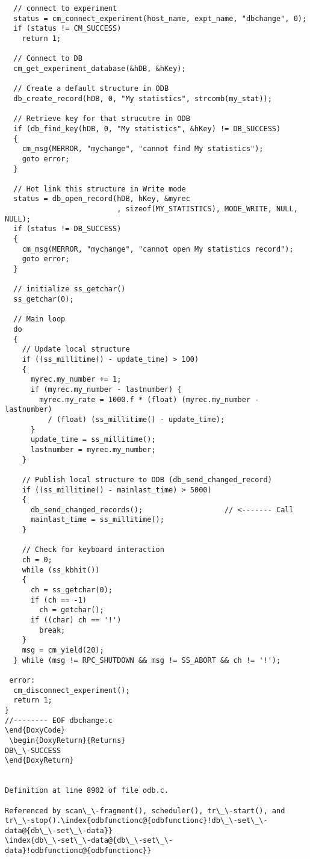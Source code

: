 \begin{DoxyItemize}
\begin{DoxyCode}
\begin{verbatim}
  // connect to experiment
  status = cm_connect_experiment(host_name, expt_name, "dbchange", 0);
  if (status != CM_SUCCESS)
    return 1;

  // Connect to DB
  cm_get_experiment_database(&hDB, &hKey);

  // Create a default structure in ODB
  db_create_record(hDB, 0, "My statistics", strcomb(my_stat));

  // Retrieve key for that strucutre in ODB
  if (db_find_key(hDB, 0, "My statistics", &hKey) != DB_SUCCESS)
  {
    cm_msg(MERROR, "mychange", "cannot find My statistics");
    goto error;
  }

  // Hot link this structure in Write mode
  status = db_open_record(hDB, hKey, &myrec
                          , sizeof(MY_STATISTICS), MODE_WRITE, NULL, NULL);
  if (status != DB_SUCCESS)
  {
    cm_msg(MERROR, "mychange", "cannot open My statistics record");
    goto error;
  }

  // initialize ss_getchar()
  ss_getchar(0);

  // Main loop
  do
  {
    // Update local structure
    if ((ss_millitime() - update_time) > 100)
    {
      myrec.my_number += 1;
      if (myrec.my_number - lastnumber) {
        myrec.my_rate = 1000.f * (float) (myrec.my_number - lastnumber)
          / (float) (ss_millitime() - update_time);
      }
      update_time = ss_millitime();
      lastnumber = myrec.my_number;
    }

    // Publish local structure to ODB (db_send_changed_record)
    if ((ss_millitime() - mainlast_time) > 5000)
    {
      db_send_changed_records();                   // <------- Call
      mainlast_time = ss_millitime();
    }

    // Check for keyboard interaction
    ch = 0;
    while (ss_kbhit())
    {
      ch = ss_getchar(0);
      if (ch == -1)
        ch = getchar();
      if ((char) ch == '!')
        break;
    }
    msg = cm_yield(20);
  } while (msg != RPC_SHUTDOWN && msg != SS_ABORT && ch != '!');

 error:
  cm_disconnect_experiment();
  return 1;
}
//-------- EOF dbchange.c
\end{DoxyCode}
 \begin{DoxyReturn}{Returns}
DB\_\-SUCCESS 
\end{DoxyReturn}


Definition at line 8902 of file odb.c.

Referenced by scan\_\-fragment(), scheduler(), tr\_\-start(), and tr\_\-stop().\index{odbfunctionc@{odbfunctionc}!db\_\-set\_\-data@{db\_\-set\_\-data}}
\index{db\_\-set\_\-data@{db\_\-set\_\-data}!odbfunctionc@{odbfunctionc}}

\end{verbatim}
\end{DoxyCode}
\end{DoxyItemize}
